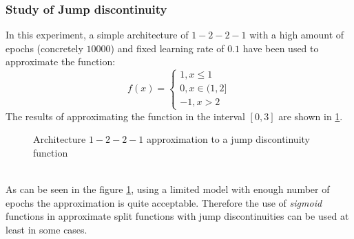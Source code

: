 \documentclass[a4paper, 11pt]{article}
\begin{document}
\subsubsection{Study of Jump discontinuity}
In this experiment, a simple architecture of $1-2-2-1$ with a high amount of epochs (concretely $10000$) and fixed learning rate of $0.1$ have been used to approximate the function:
$$ f(x) = \left\{ \begin{matrix}
    1, x \leq 1 \\
    0, x \in (1,2] \\
 -1, x > 2
\end{matrix} \right. $$
The results of approximating the function in the interval $[0,3]$ are shown in \ref{disc}.
\begin{figure}[h]
    \centering
    \caption{Architecture $1-2-2-1$ approximation to a jump discontinuity function}
    \label{disc}
\end{figure}\\
As can be seen in the figure \ref{disc}, using a limited model with enough number of epochs the approximation is quite acceptable. Therefore the use of \textit{sigmoid} functions in approximate split functions with jump discontinuities can be used at least in some cases.
\end{document}
